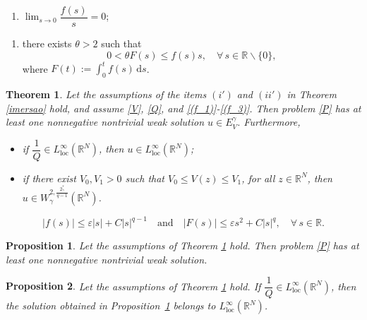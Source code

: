 \documentclass[10pt,a4paper]{amsart}
\newtheorem{theorem}{Theorem}
\newtheorem{proposition}{Proposition}
\newcommand{\R}{\mathbb{R}}
\begin{document}
\begin{enumerate}[label=($f_1$),ref=$(f_1)$]
	\item \label{(f_1)} 
    \(\displaystyle\lim_{s\to 0}\dfrac{f(s)}{s}=0\);
\end{enumerate}

\begin{enumerate}[label=($f_3$),ref=$(f_3)$]
	\item \label{(f_3)} there exists $\theta>2$ such that
	$$
	0<\theta F(s) \leq f(s) s, \quad \forall \, s \in \mathbb{R} \backslash\{0\},
	$$	
	where $F(t):=\int_0^t f(s) \,\mathrm{d} s$.
\end{enumerate}

\begin{theorem}\label{existencia_de_solucao} Let the assumptions of the items $(i')$ and $(ii')$ in Theorem \ref{imersao} hold, and assume \ref{V}, \ref{Q}, and \ref{(f_1)}-\ref{(f_3)}. Then problem \eqref{P} has at
	least one nonnegative nontrivial weak solution $u\in E_V^\gamma$. Furthermore,
	\begin{itemize}
		\item [$(i)$] if $\dfrac{1}{Q} \in L^\infty_{\mathrm{loc}}(\R^N)$, then $u\in L^\infty_{\mathrm{loc}}(\mathbb{R}^N)$;

        
		\item[$(ii)$] if there exist $V_0, V_1>0$ such that $V_0\leq V(z)\leq V_1$, for all $z\in\R^N$, then $u \in W_\gamma^{2,\frac{2^*_\gamma}{q-1}}(\R^N)$.
	\end{itemize}
\end{theorem}

\begin{equation}\label{fcond}
	|f(s)| \leq \varepsilon|s| + C|s|^{q-1}	\quad \mbox{and} \quad |F(s)| \leq \varepsilon s^2 + C|s|^{q}, \quad \forall \, s \in \mathbb{R}.
\end{equation}

    \begin{proposition}\label{existencia-solucao}
	Let the assumptions of Theorem \ref{existencia_de_solucao} hold. Then problem \eqref{P} has at
	least one nonnegative nontrivial weak solution.
\end{proposition}

    \begin{proposition}
	Let the assumptions of Theorem \ref{existencia_de_solucao} hold. If $\dfrac{1}{Q}\in L^\infty_{\mathrm{loc}}(\R^N)$, then the solution obtained in Proposition~\ref{existencia-solucao} belongs to $L^\infty_{\mathrm{loc}}(\mathbb{R}^N)$.
\end{proposition}
\end{document}
